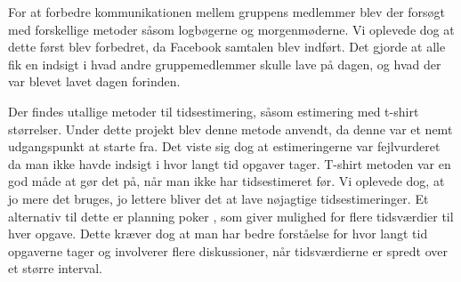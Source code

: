\noindent For at forbedre kommunikationen mellem gruppens medlemmer blev der forsøgt med forskellige metoder såsom logbøgerne og morgenmøderne. Vi oplevede dog at dette først blev forbedret, da Facebook samtalen blev indført. Det gjorde at alle fik en indsigt i hvad andre gruppemedlemmer skulle lave på dagen, og hvad der var blevet lavet dagen forinden. \newline

\noindent Der findes utallige metoder til tidsestimering, såsom estimering med t-shirt størrelser. Under dette projekt blev denne metode anvendt, da denne var et nemt udgangspunkt at starte fra. Det viste sig dog at estimeringerne var fejlvurderet da man ikke havde indsigt i hvor langt tid opgaver tager. T-shirt metoden var en god måde at gør det på, når man ikke har tidsestimeret før. Vi oplevede dog, at jo mere det bruges, jo lettere bliver det at lave nøjagtige tidsestimeringer. Et alternativ til dette er planning poker \cite{planningpoker}, som giver mulighed for flere tidsværdier til hver opgave. Dette kræver dog at man har bedre forståelse for hvor langt tid opgaverne tager og involverer flere diskussioner, når tidsværdierne er spredt over et større interval. 